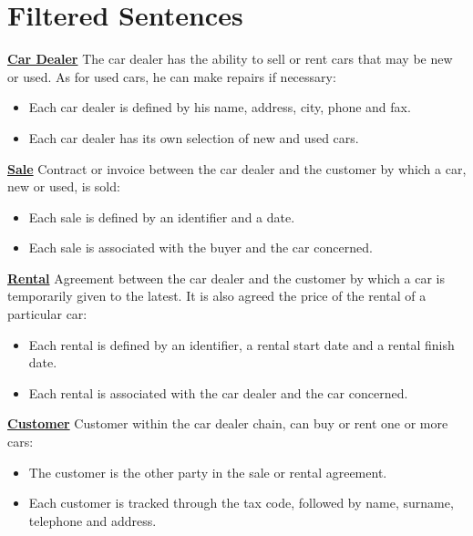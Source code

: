\section{Filtered Sentences}
\noindent \textbf{{\large \underline{Car Dealer}}} 
\vspace{0.1cm}
\newline
The car dealer has the ability to sell or rent cars that may be new or used. As for used cars, he can make repairs if necessary:
\begin{itemize}
    \item Each car dealer is defined by his name, address, city, phone and fax. 
    \item Each car dealer has its own selection of new and used cars.
\end{itemize}

\noindent \textbf{{\large \underline{Sale}}}
\vspace{0.1cm}
\newline
Contract or invoice between the car dealer and the customer by which a car, new or used, is sold:
\begin{itemize}
    \item Each sale is defined by an identifier and a date.
    \item Each sale is associated with the buyer and the car concerned.
\end{itemize}

\noindent \textbf{{\large \underline{Rental}}}
\vspace{0.1cm}
\newline
Agreement between the car dealer and the customer by which a car is temporarily given to the latest.
It is also agreed the price of the rental of a particular car:
\begin{itemize}
    \item Each rental is defined by an identifier, a rental start date and a rental finish date.
    \item Each rental is associated with the car dealer and the car concerned.
\end{itemize}

\noindent \textbf{{\large \underline{Customer}}}
\vspace{0.1cm}
\newline
Customer within the car dealer chain, can buy or rent one or more cars:
\begin{itemize}
    \item The customer is the other party in the sale or rental agreement.
    \item Each customer is tracked through the tax code, followed by name, surname, 
          telephone and address. 
\end{itemize}

